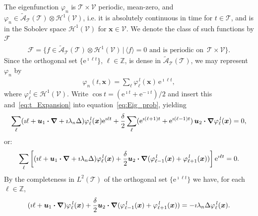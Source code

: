\documentclass[leqno,onefignum,onetabnum]{siamltex1213}
\newcommand{\e}{\mathrm{e}}
\newcommand{\Tc}{\mathcal{T}}
\newcommand{\Vc}{\mathcal{V}}
\newcommand{\Hs}{\mathscr{H}}
\newcommand{\As}{\mathscr{A}}
\newcommand{\Fs}{\mathscr{F}}
\newcommand\bnabla{\mbox{\boldmath${\nabla}$}}
\providecommand\bcdot{\boldsymbol{\cdot}}
\newcommand{\vecx}{\boldsymbol{x}}
\newcommand{\vecu}{\boldsymbol{u}}
\begin{document}
The eigenfunction $\varphi_n$ is $\Tc\times\Vc$ periodic, mean-zero, and
$\varphi_n\in\tilde{\As}_{\Tc}(\Tc)\otimes\Hs^1(\Vc)$,
i.e. it is absolutely continuous in time
for $t\in\Tc$, and is in the Sobolev space $\Hs^1(\Vc)$ for
$\vecx\in\Vc$. We denote the class of such functions by $\Fs$
%
\begin{align}\label{eq:F}
  \Fs=\{f\in\tilde{\As}_{\Tc}(\Tc)\otimes\Hs^1(\Vc)\,|\, \langle f\rangle=0  \text{ and is periodic on }
  \, \Tc\times\Vc\}. 
\end{align}
%
Since the orthogonal set $\{\e^{\imath\ell t}\}$,
${\ell\in\mathbb{Z}}$, is dense in $\tilde{\As}_{\Tc}(\Tc)$, we may represent $\varphi_n$ by 
%
\begin{align}\label{eq:t_Expansion}
  \varphi_n(t,\vecx)=\sum_\ell\varphi_\ell^{\,l}(\vecx)\,\e^{\imath \ell t},
\end{align}
%
where $\varphi_\ell^{\,l}\in\Hs^1(\Vc)$. Write $\cos{t}=(\e^{\imath t}+\e^{-\imath t})/2$ and insert
this and~\eqref{eq:t_Expansion} into equation~\eqref{eq:Eig_prob},
yielding   
%
\begin{align}
  \sum_\ell(\imath \ell + \vecu _1\bcdot\bnabla +\imath\lambda_n\Delta)\varphi_\ell^{\,l}(\vecx)\e^{\imath \ell t}
 +\frac{\delta}{2}\sum_\ell(\e^{\imath(\ell+1)t}+\e^{\imath(\ell-1)t})\,\vecu _2\bcdot\bnabla \varphi_\ell^{\,l}(\vecx)=0,
\end{align}
%
or:
%
\begin{align}
  \sum_\ell\left[(\imath \ell + \vecu _1\bcdot\bnabla +\imath\lambda_n\Delta)\varphi_\ell^{\,l}(\vecx)
 +\frac{\delta}{2}\vecu _2\bcdot\bnabla (\varphi^{\,l}_{\ell-1}(\vecx)+\varphi^{\,l}_{\ell+1}(\vecx))\right]\e^{\imath \ell t}=0.
\end{align}
%
By the completeness in $L^2(\Tc)$ of the orthogonal set $\{\e^{\imath \ell t}\}$ we
have, for each $\ell\in\mathbb{Z}$, 
%
\begin{align}\label{eq:Eig_prob_shift}
  (\imath \ell + \vecu _1\bcdot\bnabla )\varphi_\ell^{\,l}(\vecx)
 +\frac{\delta}{2}\vecu _2\bcdot\bnabla (\varphi_{\ell-1}^{\,l}(\vecx)+\varphi_{\ell+1}^{\,l}(\vecx))
 =-\imath\lambda_n\Delta\varphi_\ell^{\,l}(\vecx).
\end{align}
%
\end{document}

